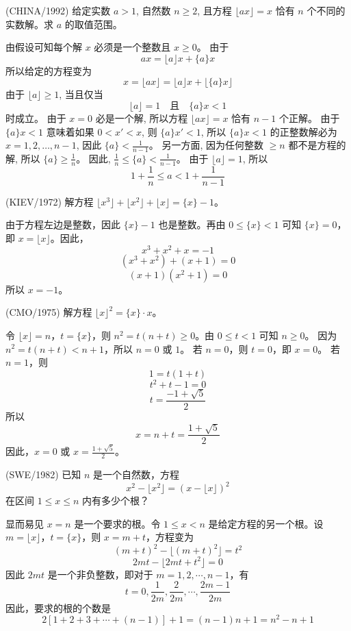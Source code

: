 \begin{questions}
\question (CHINA/1992) 给定实数 $a > 1$, 自然数 $n \ge 2$, 且方程 $\lfloor ax \rfloor = x$ 恰有 $n$ 个不同的实数解。求 $a$ 的取值范围。

\begin{solution}
由假设可知每个解 $x$ 必须是一个整数且 $x \ge 0$。
由于
\[
ax = \lfloor a \rfloor x + \{a\}x
\]
所以给定的方程变为
\[
x = \lfloor ax \rfloor = \lfloor a \rfloor x + \lfloor \{a\}x \rfloor
\]
由于 $\lfloor a \rfloor \ge 1$, 当且仅当
\[
\lfloor a \rfloor = 1 \quad \text{且} \quad \{a\}x < 1
\]
时成立。
由于 $x = 0$ 必是一个解, 所以方程 $\lfloor ax \rfloor = x$ 恰有 $n - 1$ 个正解。
由于 $\{a\}x < 1$ 意味着如果 $0 < x' < x$, 则 $\{a\}x' < 1$, 所以 $\{a\}x < 1$ 的正整数解必为 $x = 1, 2, \dots, n - 1$, 因此 $\{a\} < \frac{1}{n - 1}$。
另一方面, 因为任何整数 $\ge n$ 都不是方程的解, 所以 $\{a\} \ge \frac{1}{n}$。
因此, $\frac{1}{n} \le \{a\} < \frac{1}{n - 1}$。
由于 $\lfloor a \rfloor = 1$, 所以
\[
1 + \frac{1}{n} \le a < 1 + \frac{1}{n - 1}
\]
\end{solution}

\question (KIEV/1972) 解方程 $\lfloor x^3 \rfloor + \lfloor x^2 \rfloor + \lfloor x \rfloor = \{x\} - 1$。

\begin{solution}
由于方程左边是整数，因此 $\{x\} - 1$ 也是整数。再由 $0 \le \{x\} < 1$ 可知 $\{x\} = 0$，即 $x = \lfloor x \rfloor$。因此，
\[
x^3 + x^2 + x = -1
\]
\[
(x^3 + x^2) + (x + 1) = 0
\]
\[
(x + 1)(x^2 + 1) = 0
\]
所以 $x = -1$。
\end{solution}

\question (CMO/1975) 解方程 $\lfloor x \rfloor^2 = \{x\} \cdot x$。

\begin{solution}
令 $\lfloor x \rfloor = n$，$t = \{x\}$，则 $n^2 = t(n + t) \ge 0$。由 $0 \le t < 1$ 可知 $n \ge 0$。
因为 $n^2 = t(n + t) < n + 1$，所以 $n = 0$ 或 $1$。
若 $n = 0$，则 $t = 0$，即 $x = 0$。
若 $n = 1$，则
\[
1 = t(1 + t)
\]
\[
t^2 + t - 1 = 0
\]
\[
t = \frac{-1 + \sqrt{5}}{2}
\]
所以
\[
x = n + t = \frac{1 + \sqrt{5}}{2}
\]
因此，$x = 0$ 或 $x = \frac{1 + \sqrt{5}}{2}$。
\end{solution}

\question (SWE/1982) 已知 $n$ 是一个自然数，方程
\[
x^2 - \lfloor x^2 \rfloor = (x - \lfloor x \rfloor)^2
\]
在区间 $1 \le x \le n$ 内有多少个根？

\begin{solution}
显而易见 $x = n$ 是一个要求的根。令 $1 \le x < n$ 是给定方程的另一个根。设 $m = \lfloor x \rfloor$，$t = \{x\}$，则 $x = m + t$，方程变为
\[
(m + t)^2 - \lfloor (m + t)^2 \rfloor = t^2
\]
\[
2mt - \lfloor 2mt + t^2 \rfloor = 0
\]
因此 $2mt$ 是一个非负整数，即对于 $m = 1, 2, \cdots, n - 1$，有
\[
t = 0, \frac{1}{2m}, \frac{2}{2m}, \cdots, \frac{2m - 1}{2m}
\]
因此，要求的根的个数是
\[
2[1 + 2 + 3 + \cdots + (n - 1)] + 1 = (n - 1)n + 1 = n^2 - n + 1
\]
\end{solution}


\end{questions}
